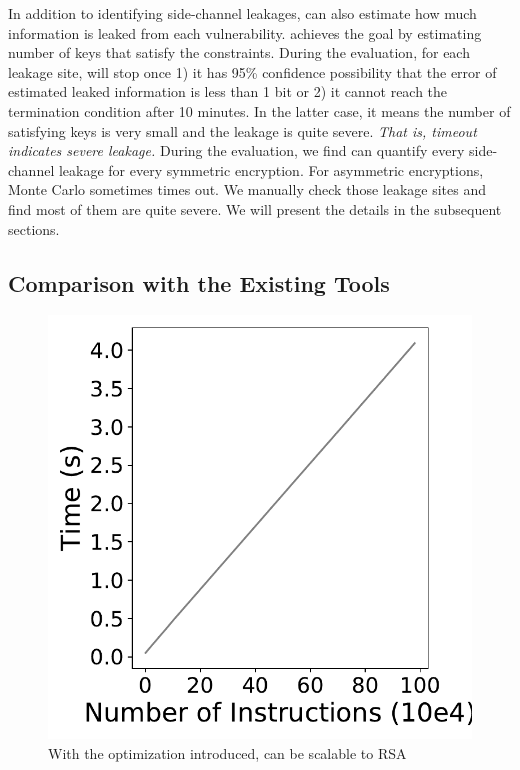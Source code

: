 In addition to identifying side-channel leakages, \tool{} can also estimate how
much information is leaked from each vulnerability. \tool{} achieves the goal by
estimating number of keys that satisfy the constraints. During the evaluation,
for each leakage site, \tool{} will stop once 1) it has 95\% confidence
possibility that the error of estimated leaked information is less than 1 bit or
2) it cannot reach the termination condition after 10 minutes. In the latter
case, it means the number of satisfying keys is very small and the leakage is
quite severe. \emph{That is, timeout indicates severe leakage.}
\label{loc:timeout}
During the evaluation,
we find \tool{} can quantify every side-channel leakage for every symmetric
encryption. For asymmetric encryptions, Monte Carlo sometimes
times out. We manually check those leakage sites and find most of them are quite severe.
We will present the details in the subsequent sections.

\subsection{Comparison with the Existing Tools}
\label{eval:scala}

\begin{figure}
    \centering
    \includegraphics[width=.8\columnwidth]{./figures/result/running_time.pdf}
    \caption{With the optimization introduced, \tool{} can be scalable to RSA}
\end{figure}

